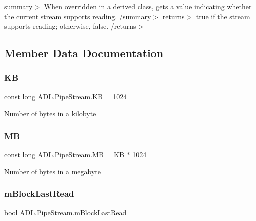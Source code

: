 summary$>$ When overridden in a derived class, gets a value indicating whether the current stream supports reading. /summary$>$ returns$>$ true if the stream supports reading; otherwise, false. /returns$>$ 

\subsection{Member Data Documentation}
\mbox{\label{class_a_d_l_1_1_pipe_stream_a497552b08f4c042b6a9d2c6be350181e}} 
\subsubsection{\texorpdfstring{KB}{KB}}
{\footnotesize\ttfamily const long A\+D\+L.\+Pipe\+Stream.\+KB = 1024}



Number of bytes in a kilobyte 

\mbox{\label{class_a_d_l_1_1_pipe_stream_ad4a04360b3d017567a0fd48defd434d0}} 
\subsubsection{\texorpdfstring{MB}{MB}}
{\footnotesize\ttfamily const long A\+D\+L.\+Pipe\+Stream.\+MB = \mbox{\hyperlink{class_a_d_l_1_1_pipe_stream_a497552b08f4c042b6a9d2c6be350181e}{KB}} $\ast$ 1024}



Number of bytes in a megabyte 

\mbox{\label{class_a_d_l_1_1_pipe_stream_a1dd964eae6da39ffb26d8bb1ff8ffaa7}} 
\subsubsection{\texorpdfstring{m\+Block\+Last\+Read}{mBlockLastRead}}
{\footnotesize\ttfamily bool A\+D\+L.\+Pipe\+Stream.\+m\+Block\+Last\+Read\hspace{0.3cm}{\ttfamily [private]}}



